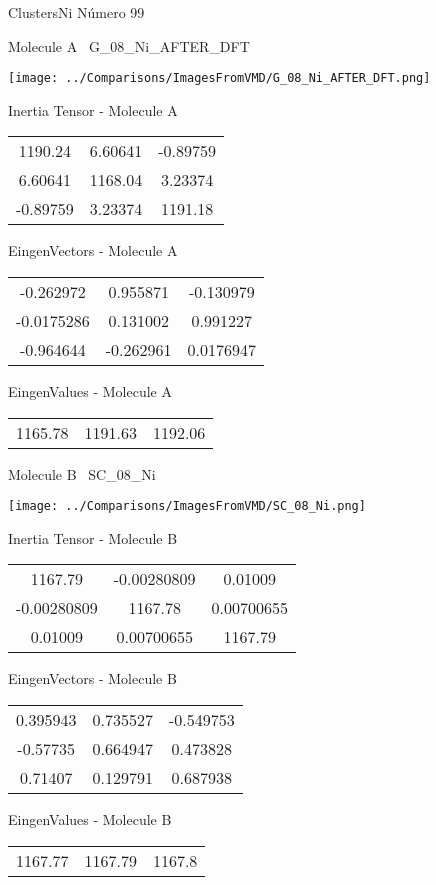 \vtab[-3cm]
\begin{center}
{\large ClustersNi \tab Número 99}
\end{center}
\begin{multicols}{2}
\begin{center}

Molecule A \
G\_08\_Ni\_AFTER\_DFT

\texttt{[image: ../Comparisons/ImagesFromVMD/G\_08\_Ni\_AFTER\_DFT.png]}

Inertia Tensor - Molecule A \\
\begin{tabular}{|c c c|}
1190.24	 & 	6.60641	 & 	-0.89759	 \\
6.60641	 & 	1168.04	 & 	3.23374	 \\
-0.89759	 & 	3.23374	 & 	1191.18
\end{tabular}

\vtab
 EingenVectors - Molecule A     \\
\begin{tabular}{|c c c|}
-0.262972	 & 	0.955871	 & 	-0.130979	 \\
-0.0175286	 & 	0.131002	 & 	0.991227	 \\
-0.964644	 & 	-0.262961	 & 	0.0176947
\end{tabular}

\vtab
 EingenValues - Molecule A     \\
\begin{tabular}{|c c c|}
1165.78	 & 	1191.63	 & 	1192.06	 \\
\end{tabular}
\columnbreak

Molecule B \
SC\_08\_Ni

\texttt{[image: ../Comparisons/ImagesFromVMD/SC\_08\_Ni.png]}

Inertia Tensor - Molecule B \\
\begin{tabular}{|c c c|}
1167.79	 & 	-0.00280809	 & 	0.01009	 \\
-0.00280809	 & 	1167.78	 & 	0.00700655	 \\
0.01009	 & 	0.00700655	 & 	1167.79
\end{tabular}

\vtab
 EingenVectors - Molecule B     \\
\begin{tabular}{|c c c|}
0.395943	 & 	0.735527	 & 	-0.549753	 \\
-0.57735	 & 	0.664947	 & 	0.473828	 \\
0.71407	 & 	0.129791	 & 	0.687938
\end{tabular}

\vtab
 EingenValues - Molecule B     \\
\begin{tabular}{|c c c|}
1167.77	 & 	1167.79	 & 	1167.8	 \\
\end{tabular}

\end{center}
\end{multicols}

